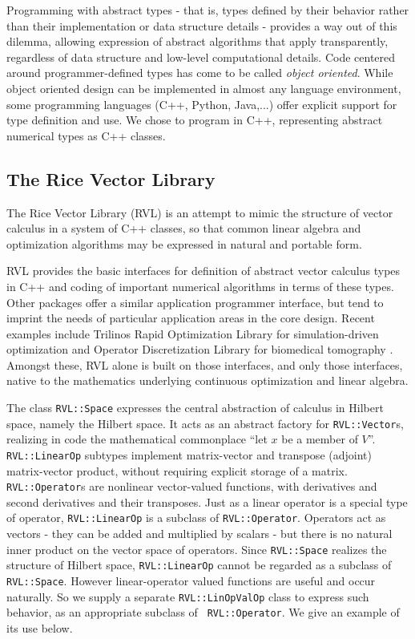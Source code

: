 Programming with abstract types - that is, types defined by their
behavior rather than their implementation or data structure details -
provides a way out of this dilemma, allowing expression of abstract
algorithms that apply transparently, regardless of data structure and
low-level computational details. Code centered around
programmer-defined types has come to be called {\em object oriented}. 
While object oriented design can be implemented in almost
any language environment, some programming languages (C++, Python,
Java,...) offer explicit support for type definition and use. We chose
to program in C++, representing abstract numerical types as C++ classes.

\subsection{The Rice Vector Library}
The Rice Vector Library (RVL) \cite[]{RVLTOMS} is an attempt to mimic
the structure of vector calculus in a system of C++ classes, so that common linear
algebra and optimization algorithms may be expressed in natural and
portable form.

RVL provides the basic interfaces for definition of abstract vector
calculus types in C++ and coding of important numerical algorithms in
terms of these types. Other packages offer a similar application
programmer interface, but tend to imprint the needs of particular
application areas in the core design. Recent examples include
Trilinos Rapid Optimization Library for simulation-driven optimization
\cite[]{ROL:15} and Operator Discretization Library for biomedical
tomography \cite[]{ODL:16}. Amongst these, RVL alone is built on those
interfaces, and only those interfaces, native to the mathematics
underlying continuous optimization and linear algebra.

The class {\tt RVL::Space} expresses the central abstraction of
calculus in Hilbert space, namely the Hilbert space. It acts as an
abstract factory for {\tt RVL::Vector}s, realizing in code the
mathematical commonplace ``let $x$ be a member of $V$''. 
{\tt RVL::LinearOp} subtypes implement matrix-vector and transpose (adjoint)
matrix-vector product, without requiring explicit storage of a matrix.
{\tt RVL::Operator}s are nonlinear vector-valued
functions, with derivatives and second derivatives and their
transposes. Just as a linear operator is a special type of operator,
{\tt RVL::LinearOp} is a subclass of {\tt RVL::Operator}. Operators
act as vectors - they can be added and multiplied by scalars - but
there is no natural inner product on the vector space of
operators. Since {\tt RVL::Space} realizes the structure of Hilbert
space, {\tt RVL::LinearOp} cannot be regarded as a subclass of {\tt
  RVL::Space}.  However linear-operator valued functions are useful
and occur naturally. So we supply a separate {\tt RVL::LinOpValOp}
class to express such behavior, as an appropriate subclass of {\tt
  RVL::Operator}. We give an example of its use below.

